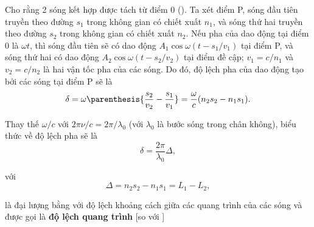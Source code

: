 Cho rằng 2 sóng kết hợp được tách từ điểm $0$ ().
Ta xét điểm P, sóng đầu tiên truyền theo đường $s_1$ trong không gian có chiết xuất $n_1$, và sóng thứ hai truyền theo đường $s_2$ trong không gian có chiết xuất $n_2$.
Nếu pha của dao động tại điểm $0$ là $\omega t$, thì sóng đầu tiên sẽ có dao động $A_1\cos\omega(t-s_1/v_1)$ tại điểm P, và sóng thứ hai có dao động $A_2\cos\omega(t-s_2/v_2)$ tại điểm đề cập; $v_1=c/n_1$ và $v_2=c/n_2$ là hai vận tốc pha của các sóng.
Do đó, độ lệch pha của dao động tạo bởi các sóng tại điểm P sẽ là
\begin{equation*}
    \delta = \omega \parenthesis{\frac{s_2}{v_2} - \frac{s_1}{v_1}} = \frac{\omega}{c} (n_2 s_2 - n_1 s_1).
\end{equation*}

\noindent
Thay thế $\omega/c$ với $2\pi\nu/c = 2\pi/\lambda_0$ (với $\lambda_0$ là bước sóng trong chân không), biểu thức về độ lệch pha sẽ là
\begin{equation}\label{eq:17_3}
    \delta = \frac{2 \pi}{\lambda_0} \Delta,
\end{equation}

\noindent
với
\begin{equation}\label{eq:17_4}
    \Delta = n_2 s_2 - n_1 s_1 = L_1 - L_2,
\end{equation}

\noindent
là đại lượng bằng với độ lệch khoảng cách giữa các quang trình của các sóng và được gọi là \textbf{độ lệch quang trình} [so với ]


